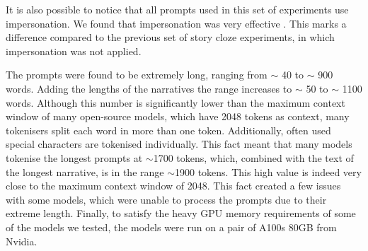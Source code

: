 It is also possible to notice that all prompts used in this set of experiments use impersonation. We found that impersonation was very effective \cite{impersonation}. This marks a difference compared to the previous set of story cloze experiments, in which impersonation was not applied.

The prompts were found to be extremely long, ranging from $\sim$ 40  to $\sim$ 900 words. Adding the lengths of the narratives the range increases to  $\sim$ 50 to $\sim$ 1100 words. Although this number is significantly lower than the maximum context window of many open-source models, which have 2048 tokens as context, many tokenisers split each word in more than one token. Additionally, often used special characters are tokenised individually. This fact meant that many models tokenise the longest prompts at $\sim$1700 tokens, which, combined with the text of the longest narrative, is in the range $\sim$1900 tokens. This high value is indeed very close to the maximum context window of 2048. This fact created a few issues with some models, which were unable to process the prompts due to their extreme length. 
Finally, to satisfy the heavy GPU memory requirements of some of the models we tested, the models were run on a pair of A100s 80GB from Nvidia. 
